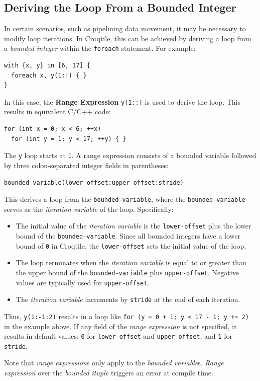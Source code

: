 \subsection*{Deriving the Loop From a Bounded Integer}

In certain scenarios, such as pipelining data movement, it may be necessary to modify loop iterations. In Croqtile, this can be achieved by deriving a loop from a \emph{bounded integer} within the \texttt{foreach} statement. For example:

\begin{lstlisting}[language=croqtile,caption={A tuple of bounded variables}]
with {x, y} in [6, 17] {
  foreach x, y(1::) { }
}
\end{lstlisting}

In this case, the \textbf{Range Expression} \texttt{y(1::)} is used to derive the loop. This results in equivalent C/C++ code:

\begin{lstlisting}[language={},caption={The derived C++ loop}]
for (int x = 0; x < 6; ++x)
  for (int y = 1; y < 17; ++y) { }
\end{lstlisting}

The \texttt{y} loop starts at \texttt{1}. A range expression consists of a bounded variable followed by three colon-separated integer fields in parentheses:

\begin{lstlisting}[language=croqtile,caption={The bounded-variable syntax}]
  bounded-variable(lower-offset:upper-offset:stride)
\end{lstlisting}

This derives a loop from the \texttt{bounded-\allowbreak{}variable}, where the \texttt{bounded-\allowbreak{}variable} serves as the \emph{iteration variable} of the loop. Specifically:

\begin{itemize}[leftmargin=1.6em]
\item The initial value of the \emph{iteration variable} is the \texttt{lower-offset} plus the lower bound of the \texttt{bounded-\allowbreak{}variable}. Since all bounded integers have a lower bound of \texttt{0} in Croqtile, the \texttt{lower-offset} sets the initial value of the loop.
\item The loop terminates when the \emph{iteration variable} is equal to or greater than the upper bound of the \texttt{bounded-\allowbreak{}variable} plus \texttt{upper-offset}. Negative values are typically used for \texttt{upper-offset}.
\item The \emph{iteration variable} increments by \texttt{stride} at the end of each iteration.
\end{itemize}

Thus, \texttt{y(1:-1:2)} results in a loop like \texttt{for (y = 0 + 1; y \textless{} 17 -\allowbreak{} 1; y += 2)} in the example above. If any field of the \emph{range expression} is not specified, it results in default values: \texttt{0} for \texttt{lower-offset} and \texttt{upper-offset}, and \texttt{1} for \texttt{stride}.

Note that \emph{range expression}s only apply to the \emph{bounded variable}s. \emph{Range expression} over the \emph{bounded ituple} triggers an error at compile time.
